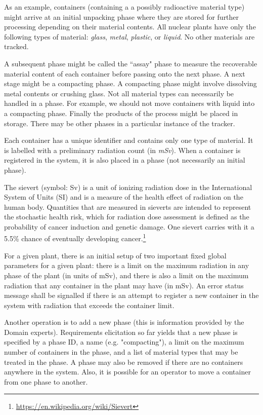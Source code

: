 As an example, containers (containing a a possibly radioactive material type) might arrive at an initial unpacking phase where they are stored for further processing depending on their material contents. All nuclear plants have only the following types of material: \textit{glass}, \textit{metal}, \textit{plastic}, or \textit{liquid}. No other materials are tracked. 

A subsequent phase might be called the ``assay" phase to measure the recoverable material content of each container before passing onto the next phase. A next stage might be  a compacting phase. A compacting phase might involve dissolving metal contents or crushing glass. Not all material types can necessarily be handled in a phase. For example, we should not move containers with liquid into a compacting phase.  Finally the products of the process might be placed in storage. There may be other phases in a particular instance of the tracker. 

Each container has a unique identifier and contains only one type of material. It is labelled with a preliminary radiation count (in \textit{mSv}). When a container is registered in the system, it is also placed in a phase (not necessarily an initial phase). 

The sievert (symbol: Sv) is a unit of ionizing radiation dose in the International System of Units (SI) and is a measure of the health effect of radiation on the human body. Quantities that are measured in sieverts are intended to represent the stochastic health risk, which for radiation dose assessment is defined as the probability of cancer induction and genetic damage. One sievert carries with it a 5.5\% chance of eventually developing cancer.\footnote{\url{https://en.wikipedia.org/wiki/Sievert}}

For a given plant,  there is an initial setup of two important fixed global parameters for a given plant: there is a limit on the maximum radiation in any phase of the plant (in units of mSv), and there is also a limit on the maximum radiation that any container in the plant may have (in mSv). An error status message shall be signalled if there is an attempt to register a new container in the system with radiation that exceeds the container limit. 

Another operation is to add a new phase (this is information provided by the Domain experts). Requirements elicitation so far yields that a new phase is specified by a phase ID, a name (e.g. "compacting"), a limit on the maximum number of containers in the phase, and a list of material types that may be treated in the phase. A phase may also be removed if there are no containers anywhere in the system. Also, it is possible for an operator to move a container from one phase to another. 


